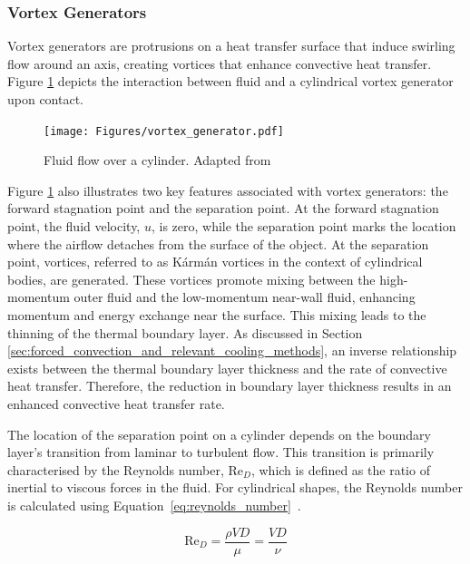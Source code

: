 \subsubsection{Vortex Generators}
Vortex generators are protrusions on a heat transfer surface that induce swirling flow around an axis, creating vortices that enhance convective heat transfer. \cite{Awais2018HeatActivities} Figure \ref{fig:vortex_generator} depicts the interaction between fluid and a cylindrical vortex generator upon contact.

\begin{figure}[H]
    \centering
    \texttt{[image: Figures/vortex\_generator.pdf]}
    \caption{Fluid flow over a cylinder. Adapted from \cite{VanTreuren2015ABSTRACTTurbines}}
    \label{fig:vortex_generator}
\end{figure}

Figure \ref{fig:vortex_generator} also illustrates two key features associated with vortex generators: the forward stagnation point and the separation point. At the forward stagnation point, the fluid velocity, $u$, is zero, while the separation point marks the location where the airflow detaches from the surface of the object. At the separation point, vortices, referred to as Kármán vortices in the context of cylindrical bodies, are generated. \cite{Wille1960KarmanStreets} These vortices promote mixing between the high-momentum outer fluid and the low-momentum near-wall fluid, enhancing momentum and energy exchange near the surface. This mixing leads to the thinning of the thermal boundary layer. As discussed in Section \ref{sec:forced_convection_and_relevant_cooling_methods}, an inverse relationship exists between the thermal boundary layer thickness and the rate of convective heat transfer. Therefore, the reduction in boundary layer thickness results in an enhanced convective heat transfer rate.

The location of the separation point on a cylinder depends on the boundary layer’s transition from laminar to turbulent flow. This transition is primarily characterised by the Reynolds number, \(\text{Re}_D\), which is defined as the ratio of inertial to viscous forces in the fluid. For cylindrical shapes, the Reynolds number is calculated using Equation~\ref{eq:reynolds_number}~\cite{Cengel2014ExternalConvection}.

\begin{equation}
    \text{Re}_D = \frac{\rho V D}{\mu} = \frac{V D}{\nu}
    \label{eq:reynolds_number}
\end{equation}


